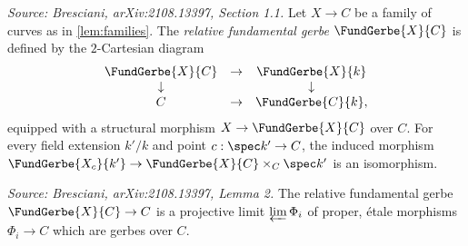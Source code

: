 \begin{definition}[RelFundGerbe]
  \label{def:rel-fund-gerbe}
  \textit{Source: Bresciani, arXiv:2108.13397, Section 1.1.}
  Let \(X \to C\) be a family of curves as in \cref{lem:families}. The
  \emph{relative fundamental gerbe} \(\FundGerbe{X}{C}\) is defined by the
  \(2\)-Cartesian diagram
  \[
    \begin{array}{ccc}
      \FundGerbe{X}{C} & \to & \FundGerbe{X}{k} \\
      \downarrow & & \downarrow \\
      C & \to & \FundGerbe{C}{k},
    \end{array}
  \]
  equipped with a structural morphism \(X \to \FundGerbe{X}{C}\) over \(C\). For
  every field extension \(k'/k\) and point \(c : \spec k' \to C\), the induced
  morphism \(\FundGerbe{X_c}{k'} \to \FundGerbe{X}{C} \times_C \spec k'\) is an
  isomorphism.
\end{definition}

\begin{lemma}[RelGerbeLimit]
  \label{lem:rel-gerbe-limit}
  \textit{Source: Bresciani, arXiv:2108.13397, Lemma 2.}
  The relative fundamental gerbe \(\FundGerbe{X}{C} \to C\) is a projective limit
  \(\varprojlim \Phi_i\) of proper, étale morphisms \(\Phi_i \to C\) which are gerbes
  over \(C\).
\end{lemma}


